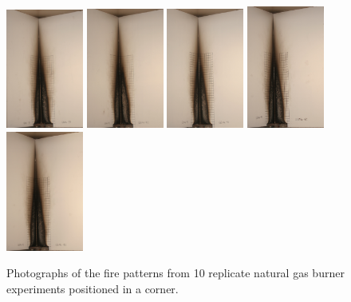 \documentclass[twoside]{uocthesis}
\begin{document}
{\begin{figure}[p]
	\includegraphics[width=1.0in]{../Figures/GBNG39_IMG_9222}
	\includegraphics[width=1.0in]{../Figures/GBNG40_IMG_9235}
	\includegraphics[width=1.0in]{../Figures/GBNG41_IMG_9249}
	\includegraphics[width=1.0in]{../Figures/GBNG42_IMG_9262}
	\includegraphics[width=1.0in]{../Figures/GBNG43_IMG_9275} \\

	\caption[Photographs of the fire patterns from 10 replicate natural gas burner experiments positioned in a corner.]{Photographs of the fire patterns from 10 replicate natural gas burner experiments positioned in a corner.}
	\label{NG_Corner}
\end{figure}

}
\end{document}
